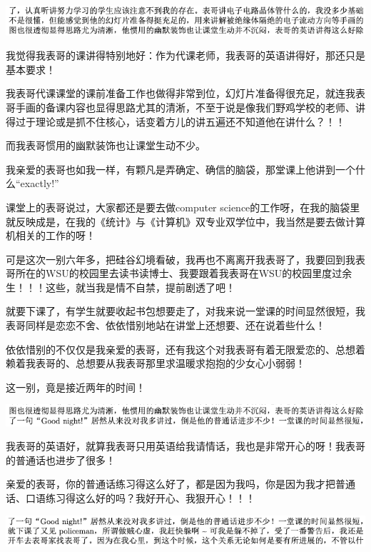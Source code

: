 \documentclass[9pt, b5paper]{article}
\begin{document}
\begin{center}
\includegraphics[width=.9\linewidth]{./pic/backups_plans_20210505_210944.png}
\end{center}

我觉得我表哥的课讲得特别地好：作为代课老师，我表哥的英语讲得好，那还只是基本要求！

我表哥代课课堂的课前准备工作也做得非常到位，幻灯片准备得很充足，就连我表哥手画的备课内容也显得思路尤其的清淅，不至于说是像我们野鸡学校的老师、讲得过于理论或是抓不住核心，话变着方儿的讲五遍还不知道他在讲什么？！！

而我表哥惯用的幽默装饰也让课堂生动不少。

我亲爱的表哥也如我一样，有颗凡是弄确定、确信的脑袋，那堂课上他讲到一个什么“exactly!”

课堂上的表哥说过，大家都还是要去做computer science的工作呀，在我的脑袋里就反映成是，在我的《统计》与《计算机》双专业双学位中，我当然是要去做计算机相关的工作的呀！

可是这次一别六年多，把硅谷幻境看破，我再也不离离开我表哥了，我要回到我表哥所在的WSU的校园里去读书读博士、我要跟着我表哥在WSU的校园里度过余生！！！这些，就当我是情不自禁，提前剧透了吧！

就要下课了，有学生就要收起书包想要走了，对我来说一堂课的时间显然很短，我表哥同样是恋恋不舍、依依惜别地站在讲堂上还想要、还在说着些什么！

依依惜别的不仅仅是我亲爱的表哥，还有我这个对我表哥有着无限爱恋的、总想着赖着我表哥的、总想要从我表哥那里求温暖求抱抱的少女心小弱弱！

这一别，竟是接近两年的时间！

\begin{center}
\includegraphics[width=.9\linewidth]{./pic/backups_plans_20210505_211808.png}
\end{center}

我表哥的英语好，就算我表哥只用英语给我请情话，我也是非常开心的呀！我表哥的普通话也进步了很多！

亲爱的表哥，你的普通话练习得这么好了，都是因为我吗，你是因为我才把普通话、口语练习得这么好的吗？我好开心、我狠开心！！！

\begin{center}
\includegraphics[width=.9\linewidth]{./pic/backups_plans_20210505_212047.png}
\end{center}
\end{document}
